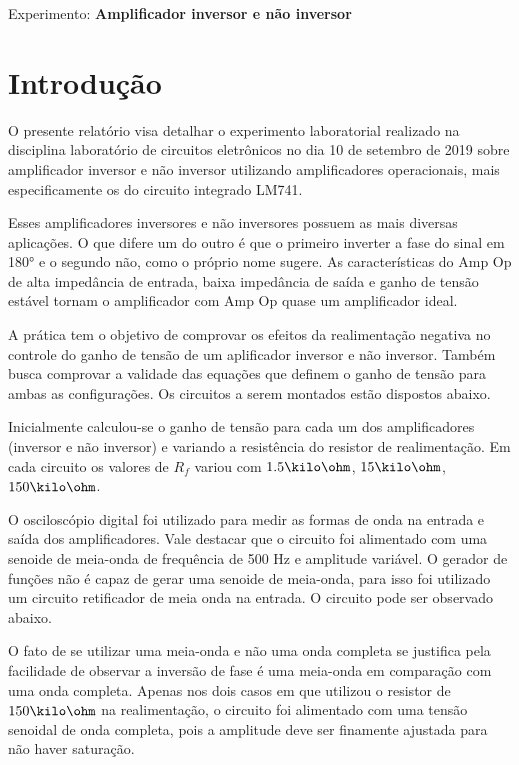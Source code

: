 \begin{center}
\large Experimento: \textbf{Amplificador inversor e não inversor}
\end{center}


\section{Introdução}


O presente relatório visa detalhar o experimento laboratorial realizado na disciplina laboratório de circuitos eletrônicos no dia 10 de setembro de 2019 sobre amplificador inversor e não inversor utilizando amplificadores operacionais, mais especificamente os do circuito integrado LM741.

Esses amplificadores inversores e não inversores possuem as mais diversas aplicações. O que difere um do outro é que o primeiro inverter a fase do sinal em 180° e o segundo não, como o próprio nome sugere. As características do Amp Op de alta impedância de entrada, baixa impedância de saída e ganho de tensão estável tornam o amplificador com Amp Op quase um amplificador ideal. 

A prática tem o objetivo de comprovar os efeitos da realimentação negativa no controle do ganho de tensão de um aplificador inversor e não inversor. Também busca comprovar a validade das equações que definem o ganho de tensão para ambas as configurações. Os circuitos a serem montados estão dispostos abaixo.





Inicialmente calculou-se o ganho de tensão para cada um dos amplificadores (inversor e não inversor) e variando a resistência do resistor de realimentação. Em cada circuito os valores de $R_f$ variou com $1.5 \kilo \ohm$, $15 \kilo \ohm$, $150 \kilo \ohm$.

O osciloscópio digital foi utilizado para medir as formas de onda na entrada e saída dos amplificadores. Vale destacar que o circuito foi alimentado com uma senoide de meia-onda de frequência de 500 Hz e amplitude variável. O gerador de funções não é capaz de gerar uma senoide de meia-onda, para isso foi utilizado um circuito retificador de meia onda na entrada. O circuito pode ser observado abaixo.



O fato de se utilizar uma meia-onda e não uma onda completa se justifica pela facilidade de observar a inversão de fase é uma meia-onda em comparação com uma onda completa. Apenas nos dois casos em que utilizou o resistor de $150 \kilo \ohm$ na realimentação, o circuito foi alimentado com uma tensão senoidal de onda completa, pois a amplitude deve ser finamente ajustada para não haver saturação.

